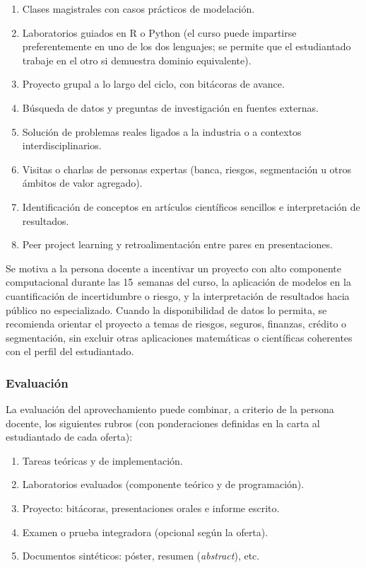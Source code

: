 \begin{refsection}
\begin{enumerate}
\item Clases magistrales con casos prácticos de modelación.
\item Laboratorios guiados en R o Python (el curso puede impartirse preferentemente en uno de los dos lenguajes; se permite que el estudiantado trabaje en el otro si demuestra dominio equivalente).
\item Proyecto grupal a lo largo del ciclo, con bitácoras de avance.
\item Búsqueda de datos y preguntas de investigación en fuentes externas.
\item Solución de problemas reales ligados a la industria o a contextos interdisciplinarios.
\item Visitas o charlas de personas expertas (banca, riesgos, segmentación u otros ámbitos de valor agregado).
\item Identificación de conceptos en artículos científicos sencillos e interpretación de resultados.
\item Peer project learning y retroalimentación entre pares en presentaciones.
\end{enumerate}

Se motiva a la persona docente a incentivar un proyecto con alto componente computacional durante las 15~semanas del curso, la aplicación de modelos en la cuantificación de incertidumbre o riesgo, y la interpretación de resultados hacia público no especializado. Cuando la disponibilidad de datos lo permita, se recomienda orientar el proyecto a temas de riesgos, seguros, finanzas, crédito o segmentación, sin excluir otras aplicaciones matemáticas o científicas coherentes con el perfil del estudiantado.

\subsubsection*{Evaluación}

La evaluación del aprovechamiento puede combinar, a criterio de la persona docente, los siguientes rubros (con ponderaciones definidas en la carta al estudiantado de cada oferta):

\begin{enumerate}
\item Tareas teóricas y de implementación.
\item Laboratorios evaluados (componente teórico y de programación).
\item Proyecto: bitácoras, presentaciones orales e informe escrito.
\item Examen o prueba integradora (opcional según la oferta).
\item Documentos sintéticos: póster, resumen (\emph{abstract}), etc.
\end{enumerate}

\nocite{JWHT23}
\nocite{JWHT13}
\nocite{HTF09}
\nocite{TCG14}
\nocite{BFO84}
\nocite{Bre01}
\nocite{LL17}
\nocite{Ger22}
\nocite{WG17}
\nocite{McK22}
\nocite{HBBB19}
\nocite{Mur12}
\nocite{YB-vds}

\printcursosbibliography

\end{refsection}
